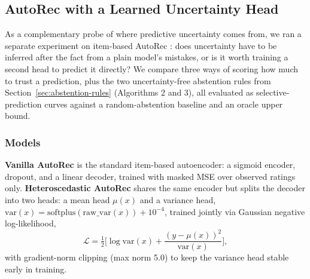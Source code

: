 
\subsection{AutoRec with a Learned Uncertainty Head}
\label{sec:autorec-uncertainty}

As a complementary probe of where predictive uncertainty comes from, we ran a
separate experiment on item-based AutoRec \citep{sedhain2015autorec}: does
uncertainty have to be inferred after the fact from a plain model's mistakes,
or is it worth training a second head to predict it directly? We compare
three ways of scoring how much to trust a prediction, plus the two
uncertainty-free abstention rules from Section~\ref{sec:abstention-rules}
(Algorithms 2 and 3), all evaluated as selective-prediction curves against a
random-abstention baseline and an oracle upper bound.

\subsubsection{Models}

\textbf{Vanilla AutoRec} is the standard item-based autoencoder: a sigmoid
encoder, dropout, and a linear decoder, trained with masked MSE over
observed ratings only. \textbf{Heteroscedastic AutoRec} shares the same
encoder but splits the decoder into two heads: a mean head $\mu(x)$ and a
variance head, $\mathrm{var}(x) = \mathrm{softplus}(\text{raw\_var}(x)) +
10^{-4}$, trained jointly via Gaussian negative log-likelihood,
\[
  \mathcal{L} = \tfrac{1}{2}\Big[\log \mathrm{var}(x) + \frac{(y-\mu(x))^2}{\mathrm{var}(x)}\Big],
\]
with gradient-norm clipping (max norm 5.0) to keep the variance head stable
early in training.

